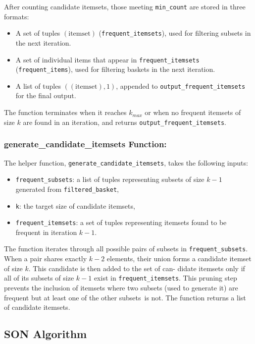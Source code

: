 \documentclass{Class/julia}
\begin{document}
\noindent After counting candidate itemsets, those meeting \texttt{min\_count} are stored in three formats:
  \begin{itemize}
  \item A set of tuples \((\text{itemset})\) (\texttt{frequent\_itemsets}), used for filtering subsets in the next iteration.
  \item A set of individual items that appear in \texttt{frequent\_itemsets} (\texttt{frequent\_items}), used for filtering baskets in the next iteration.   
  \item A list of tuples \(((\text{itemset}), 1)\), appended to \texttt{output\_frequent\_itemsets} for the final output. 
  \end{itemize}
  
\noindent The function terminates when it reaches \( k_{max} \) or when no frequent itemsets of size \( k \) are found in an iteration, and returns \texttt{output\_frequent\_itemsets}.

\subsubsection*{generate\_candidate\_itemsets Function:}

The helper function, \texttt{generate\_candidate\_itemsets}, takes the following inputs:

\begin{itemize}
\item \texttt{frequent\_subsets}: a list of tuples representing subsets of size \( k-1 \) generated from \texttt{filtered\_basket},
\item \texttt{k}: the target size of candidate itemsets,
\item \texttt{frequent\_itemsets}: a set of tuples representing itemsets found to be frequent in iteration \( k-1 \).
\end{itemize}

The function iterates through all possible pairs of subsets in \texttt{frequent\_subsets}. When a pair shares exactly \( k-2 \) elements, their union forms a candidate itemset of size \( k \). This candidate is then added to the set of can- didate itemsets only if all of its subsets of size \( k-1 \) exist in \texttt{frequent\_itemsets}. This pruning step prevents the inclusion of itemsets where two subsets (used to generate it) are frequent but at least one of the other subsets~is not. The function returns a list of candidate itemsets.

\subsection{SON Algorithm}
\end{document}
